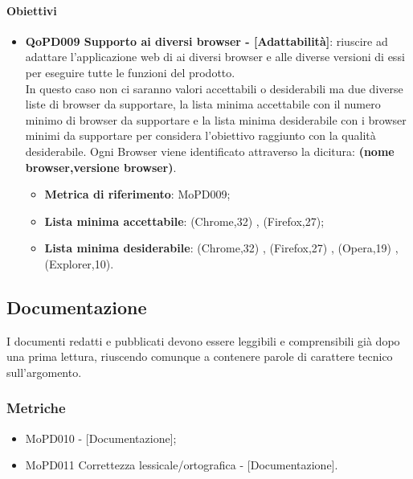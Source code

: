 \documentclass[../piano-di-qualifica.tex]{subfiles}
\begin{document}
\paragraph{Obiettivi}
\label{sub:obiettivi}
\begin{itemize}
    \item \textbf{QoPD009 Supporto ai diversi browser - [Adattabilità]}: riuscire ad adattare l'applicazione web di  ai diversi browser e alle diverse versioni di essi per eseguire tutte le funzioni del prodotto.
        \\ In questo caso non ci saranno valori accettabili o desiderabili ma due diverse liste di browser da supportare, la lista minima accettabile con il numero minimo di browser da supportare e la lista minima desiderabile con i browser minimi da supportare per considera l'obiettivo raggiunto con la qualità desiderabile.
        Ogni Browser viene identificato attraverso la dicitura: \textbf{(nome browser,versione browser)}.
        \begin{itemize}
            \item \textbf{Metrica di riferimento}: MoPD009;
            \item \textbf{Lista minima accettabile}: {(Chrome,32) , (Firefox,27)};
            \item \textbf{Lista minima desiderabile}: {(Chrome,32) , (Firefox,27) , (Opera,19) , (Explorer,10)}.
        \end{itemize}
\end{itemize}

\subsection{Documentazione}%
\label{sub:documentazione}
I documenti redatti e pubblicati devono essere leggibili e comprensibili già dopo una prima lettura, riuscendo comunque a contenere parole di carattere tecnico sull'argomento.

\subsubsection{Metriche}
\label{sub:metriche}
\begin{itemize}
    \item MoPD010  - [Documentazione];
    \item MoPD011 Correttezza lessicale/ortografica - [Documentazione].
\end{itemize}
\end{document}

